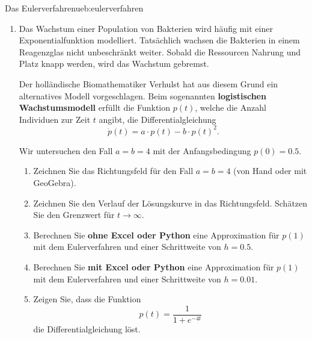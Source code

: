 \begin{ueb}{Das Eulerverfahren}{ueb:eulerverfahren}
\begin{enumerate}
        \item Das Wachstum einer Population von Bakterien wird
              häufig mit einer Exponentialfunktion modelliert.
              Tatsächlich wachsen die Bakterien in einem Reagenzglas
              nicht unbeschränkt weiter. Sobald die Ressourcen
              Nahrung und Platz knapp werden, wird das Wachstum
              gebremst.

              Der holländische Biomathematiker Verhulst hat aus
              diesem Grund ein alternatives Modell vorgeschlagen.
              Beim sogenannten \textbf{logistischen Wachstumsmodell}
              erfüllt die Funktion \(p(t)\), welche die Anzahl
              Individuen zur Zeit \(t\) angibt, die
              Differentialgleichung
              \[
                  \dot{p}(t)=a\cdot p(t)-b\cdot p(t)^2.
              \]

              Wir untersuchen den Fall \(a=b=4\) mit der
              Anfangsbedingung \(p(0)=0.5\).

              \begin{enumerate}
                  \item Zeichnen Sie das Richtungsfeld für den
                        Fall \(a=b=4\) (von Hand oder mit GeoGebra).

                  \item Zeichnen Sie den Verlauf der Lösungskurve
                        in das Richtungsfeld. Schätzen Sie den
                        Grenzwert für \(t\to\infty\).

                  \item Berechnen Sie \textbf{ohne Excel oder Python}
                        eine Approximation für \(p(1)\) mit dem
                        Eulerverfahren und einer Schrittweite
                        von \(h=0.5\).

                  \item Berechnen Sie \textbf{mit Excel oder Python}
                        eine Approximation für \(p(1)\) mit dem
                        Eulerverfahren und einer Schrittweite
                        von \(h=0.01\).

                  \item Zeigen Sie, dass die Funktion
                        \[
                            p(t)=\frac{1}{1+e^{-4t}}
                        \]
                        die Differentialgleichung löst.
              \end{enumerate}
    \end{enumerate}

\end{ueb}
\clearpage

